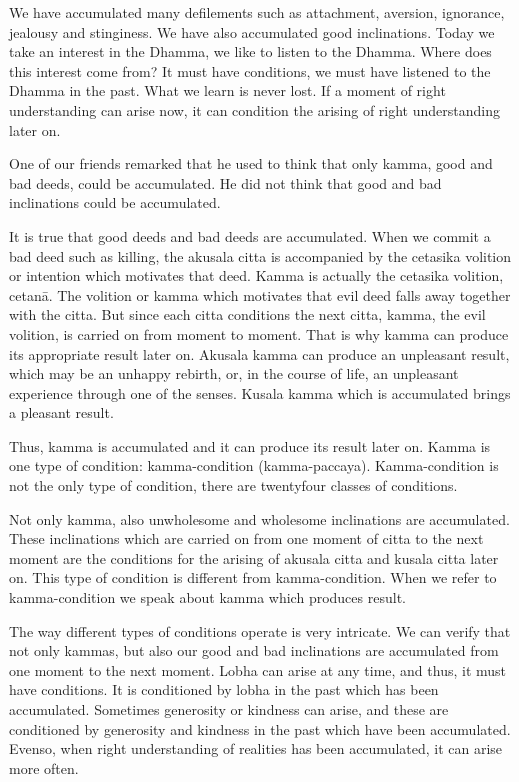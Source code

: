 We have accumulated many defilements such as attachment, aversion,
ignorance, jealousy and stinginess. We have also accumulated good
inclinations. Today we take an interest in the Dhamma, we like to listen
to the Dhamma. Where does this interest come from? It must have
conditions, we must have listened to the Dhamma in the past. What we
learn is never lost. If a moment of right understanding can arise now,
it can condition the arising of right understanding later on.

One of our friends remarked that he used to think that only kamma, good
and bad deeds, could be accumulated. He did not think that good and bad
inclinations could be accumulated.

It is true that good deeds and bad deeds are accumulated. When we commit
a bad deed such as killing, the akusala citta is accompanied by the
cetasika volition or intention which motivates that deed. Kamma is
actually the cetasika volition, cetanā. The volition or kamma which
motivates that evil deed falls away together with the citta. But since
each citta conditions the next citta, kamma, the evil volition, is
carried on from moment to moment. That is why kamma can produce its
appropriate result later on. Akusala kamma can produce an unpleasant
result, which may be an unhappy rebirth, or, in the course of life, an
unpleasant experience through one of the senses. Kusala kamma which is
accumulated brings a pleasant result.

Thus, kamma is accumulated and it can produce its result later on. Kamma
is one type of condition: kamma-condition (kamma-paccaya).
Kamma-condition is not the only type of condition, there are twentyfour
classes of conditions.

Not only kamma, also unwholesome and wholesome inclinations are
accumulated. These inclinations which are carried on from one moment of
citta to the next moment are the conditions for the arising of akusala
citta and kusala citta later on. This type of condition is different
from kamma-condition. When we refer to kamma-condition we speak about
kamma which produces result.

The way different types of conditions operate is very intricate. We can
verify that not only kammas, but also our good and bad inclinations are
accumulated from one moment to the next moment. Lobha can arise at any
time, and thus, it must have conditions. It is conditioned by lobha in
the past which has been accumulated. Sometimes generosity or kindness
can arise, and these are conditioned by generosity and kindness in the
past which have been accumulated. Evenso, when right understanding of
realities has been accumulated, it can arise more often.

